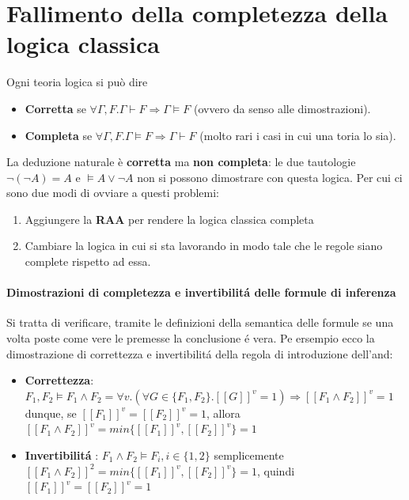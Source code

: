 \documentclass{article}
\begin{document}
\section{Fallimento della completezza della logica classica}
Ogni teoria logica si può dire 
\begin{itemize}
    \item \textbf{Corretta} se $\forall\Gamma, F.\Gamma \vdash F \Rightarrow \Gamma\vDash F$ (ovvero da senso alle dimostrazioni).
    \item \textbf{Completa} se $\forall\Gamma,F.\Gamma\vDash F \Rightarrow\Gamma\vdash F$ (molto rari i casi in cui una toria lo sia).
\end{itemize}
La deduzione naturale è \textbf{corretta} ma \textbf{non completa}: le due tautologie $\neg (\neg A) = A$ e $\vDash A \lor \neg A$ non si possono dimostrare con questa logica. Per cui ci sono due modi di ovviare a questi problemi:
\begin{enumerate}
    \item Aggiungere la \textbf{RAA} per rendere la logica classica completa
    \item Cambiare la logica in cui si sta lavorando in modo tale che le regole siano complete rispetto ad essa.
\end{enumerate}
\paragraph{Dimostrazioni di completezza e invertibilitá delle formule di inferenza}
Si tratta di verificare, tramite le definizioni della semantica delle formule se una volta poste come vere le premesse la conclusione é vera. Pe ersempio ecco la dimostrazione di correttezza e invertibilitá della regola di introduzione dell'and:
\begin{itemize}
    \item \textbf{Correttezza}: $F_1,F_2 \vDash F_1 \land F_2 = \forall v.(\forall G\in\{F_1,F_2\}.[[G]]^v=1)\Rightarrow[[F_1 \land F_2]]^v=1$ dunque, se $[[F_1]]^v=[[F_2]]^v=1$, allora $[[F_1\land F_2]]^v=min\{[[F_1]]^v,[[F_2]]^v\}=1$
    \item \textbf{Invertibilitá }: $F_1 \land F_2 \vDash F_i, i\in\{1,2\}$ semplicemente $[[F_1\land F_2]]^2 = min\{[[F_1]]^v,[[F_2]]^v\} = 1$, quindi $[[F_1]]^v=[[F_2]]^v=1$
\end{itemize}
\end{document}
